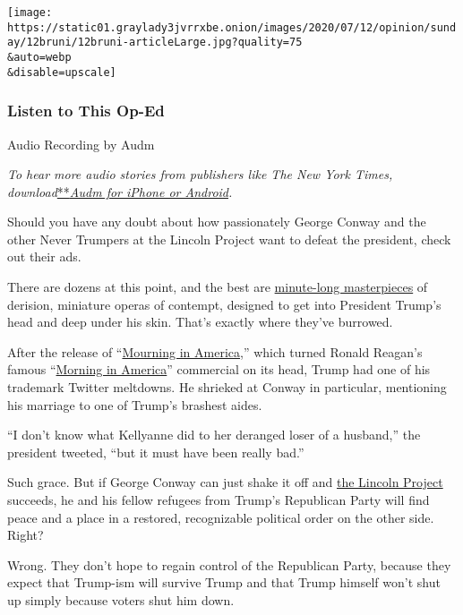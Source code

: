 \texttt{[image: https://static01.graylady3jvrrxbe.onion/images/2020/07/12/opinion/sunday/12bruni/12bruni-articleLarge.jpg?quality=75\\\&auto=webp\\\&disable=upscale]}

\hypertarget{listen-to-this-op-ed}{%
\subsubsection{Listen to This Op-Ed}\label{listen-to-this-op-ed}}

Audio Recording by Audm

\emph{To hear more audio stories from publishers like The New York
Times,
download}\href{https://www.audm.com/?utm_source=nytmag\&utm_medium=embed\&utm_campaign=left_behind_draper}{**}\href{https://www.audm.com/?utm_source=nytopinion\&utm_medium=embed\&utm_campaign=republicans_destroy_trump}{\emph{Audm
for iPhone or Android}}\emph{.}

Should you have any doubt about how passionately George Conway and the
other Never Trumpers at the Lincoln Project want to defeat the
president, check out their ads.

There are dozens at this point, and the best are
\href{https://www.bostonglobe.com/2020/07/04/nation/take-look-dozen-lincoln-projects-most-devastating-anti-trump-ads/}{minute-long
masterpieces} of derision, miniature operas of contempt, designed to get
into President Trump's head and deep under his skin. That's exactly
where they've burrowed.

After the release of
``\href{https://www.youtube.com/watch?v=t_yG_-K2MDo}{Mourning in
America},'' which turned Ronald Reagan's famous
``\href{https://www.washingtonpost.com/video/politics/ronald-reagan-morning-in-america-campaign-1984/2018/09/10/e42baddc-b525-11e8-ae4f-2c1439c96d79_video.html}{Morning
in America}'' commercial on its head, Trump had one of his trademark
Twitter meltdowns. He shrieked at Conway in particular, mentioning his
marriage to one of Trump's brashest aides.

``I don't know what Kellyanne did to her deranged loser of a husband,''
the president tweeted, ``but it must have been really bad.''

Such grace. But if George Conway can just shake it off and
\href{https://lincolnproject.us/}{the Lincoln Project} succeeds, he and
his fellow refugees from Trump's Republican Party will find peace and a
place in a restored, recognizable political order on the other side.
Right?

Wrong. They don't hope to regain control of the Republican Party,
because they expect that Trump-ism will survive Trump and that Trump
himself won't shut up simply because voters shut him down.

